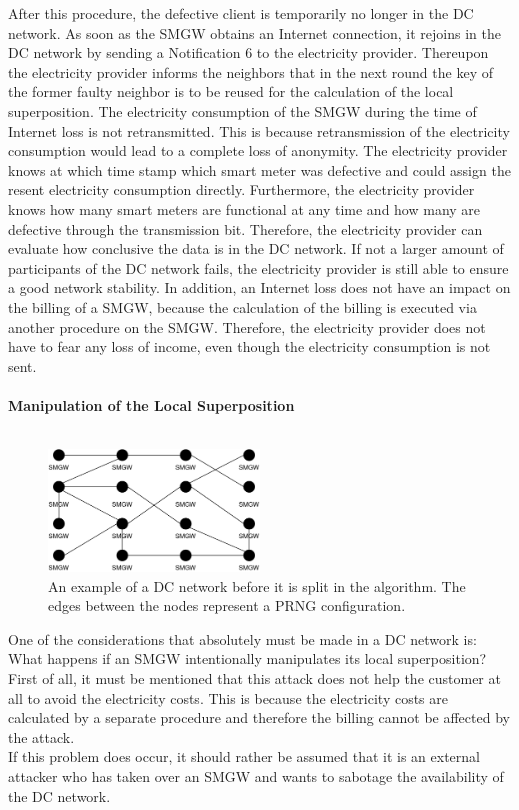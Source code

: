 After this procedure, the defective client is temporarily no longer in the DC network. As soon as the \gls{SMGW} obtains an Internet connection, it rejoins in the DC network by sending a Notification 6 to the electricity provider. Thereupon the electricity provider informs the neighbors that in the next round the key of the former faulty neighbor is to be reused for the calculation of the local superposition. The electricity consumption of the \gls{SMGW} during the time of Internet loss is not retransmitted. This is because retransmission of the electricity consumption would lead to a complete loss of anonymity. The electricity provider knows at which time stamp which smart meter was defective and could assign the resent electricity consumption directly. Furthermore, the electricity provider knows how many smart meters are functional at any time and how many are defective through the transmission bit. Therefore, the electricity provider can evaluate how conclusive the data is in the DC network. %
If not a larger amount of participants of the DC network fails, the electricity provider is still able to ensure a good network stability. %
In addition, an Internet loss does not have an impact on the billing of a \gls{SMGW}, because the calculation of the billing is executed via another procedure on the \gls{SMGW}. Therefore, the electricity provider does not have to fear any loss of income, even though the electricity consumption is not sent.\\
\\ 
\textbf{Manipulation of the Local Superposition}
\label{subsec:mani_local}
\\
\\
\begin{figure}[tbp]
  \centering
  \includegraphics[width=0.5\textwidth]{images/DC Net before Split2.png}
  \caption[Example DC Network]{An example of a DC network before it is split in the algorithm. The edges between the nodes represent a \gls{PRNG} configuration.}
  \label{fig:splitDCNetwork}
\end{figure}One of the considerations that absolutely must be made in a DC network is: What happens if an \gls{SMGW} intentionally manipulates its local superposition? First of all, it must be mentioned that this attack does not help the customer at all to avoid the electricity costs. This is because the electricity costs are calculated by a separate procedure and therefore the billing cannot be affected by the attack.\\ If this problem does occur, it should rather be assumed that it is an external attacker who has taken over an \gls{SMGW} and wants to sabotage the availability of the DC network.
